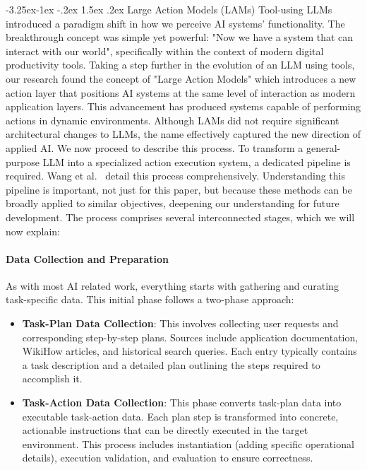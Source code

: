 \documentclass[journal,twoside,10pt]{IEEEtran}
\makeatletter
\renewcommand\subsection{\@startsection{subsection}{2}{\z@}%
                       {-3.25ex\@plus -1ex \@minus -.2ex}%
                       {1.5ex \@plus .2ex}%
                       {\normalfont\large\bfseries}}
\makeatother
\begin{document}
\subsection{Large Action Models (LAMs)}
Tool-using LLMs introduced a paradigm shift in how we perceive AI systems' functionality. The breakthrough concept was simple yet powerful: "Now we have a system that can interact with our world", specifically within the context of modern digital productivity tools. Taking a step further in the evolution of  an LLM using tools, our research found the concept of "Large Action Models" which introduces a new action layer that positions AI systems at the same level of interaction as modern application layers. This advancement has produced systems capable of performing actions in dynamic environments. Although LAMs did not require significant architectural changes to LLMs, the name effectively captured the new direction of applied AI. We now proceed to describe this process.
To transform a general-purpose LLM into a specialized action execution system, a dedicated pipeline is required. Wang et al.~\cite{wang2025lam} detail this process comprehensively. Understanding this pipeline is important, not just for this paper, but because these methods can be broadly applied to similar objectives, deepening our understanding for future development. The process comprises several interconnected stages, which we will now explain:

\paragraph{Data Collection and Preparation}
As with most AI related work, everything starts with gathering and curating task-specific data. This initial phase follows a two-phase approach:

\begin{itemize}
    \item \textbf{Task-Plan Data Collection}: This involves collecting user requests and corresponding step-by-step plans. Sources include application documentation, WikiHow articles, and historical search queries. Each entry typically contains a task description and a detailed plan outlining the steps required to accomplish it.
    
    \item \textbf{Task-Action Data Collection}: This phase converts task-plan data into executable task-action data. Each plan step is transformed into concrete, actionable instructions that can be directly executed in the target environment. This process includes instantiation (adding specific operational details), execution validation, and evaluation to ensure correctness.
\end{itemize}
\end{document}

